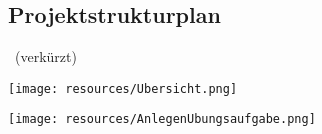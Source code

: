 \subsection{Projektstrukturplan}

\begin{frame}{\insertsectionhead}{\insertsubsectionhead~(verkürzt)}
  
\end{frame}

\begin{frame}{\insertsectionhead}{\insertsubsectionhead}
  
\end{frame}

\begin{frame}{\insertsectionhead}{\insertsubsectionhead}
  
\end{frame}

\begin{frame}{\insertsectionhead}{\insertsubsectionhead}
  \texttt{[image: resources/Ubersicht.png]}
\end{frame}

\begin{frame}{\insertsectionhead}{\insertsubsectionhead}
  \texttt{[image: resources/AnlegenUbungsaufgabe.png]}
\end{frame}
